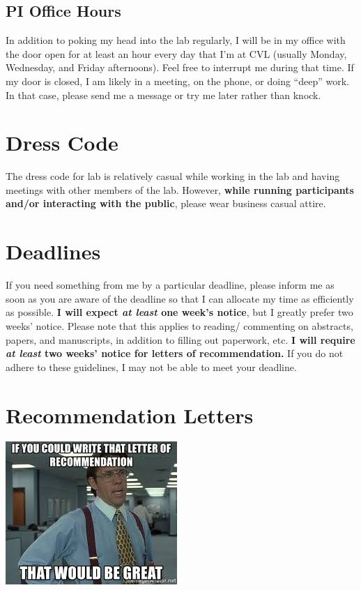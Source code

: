\documentclass[
]{book}
\begin{document}
\hypertarget{pi-office-hours}{%
\subsection{PI Office Hours}\label{pi-office-hours}}

In addition to poking my head into the lab regularly, I will be in my office with the door open for at least an hour every day that I'm at CVL (usually Monday, Wednesday, and Friday afternoons). Feel free to interrupt me during that time. If my door is closed, I am likely in a meeting, on the phone, or doing ``deep'' work. In that case, please send me a message or try me later rather than knock.

\hypertarget{dress-code}{%
\section{Dress Code}\label{dress-code}}

The dress code for lab is relatively casual while working in the lab and having meetings with other members of the lab. However,
\textbf{while running participants and/or interacting with the public}, please wear business casual attire.

\hypertarget{deadlines}{%
\section{Deadlines}\label{deadlines}}

If you need something from me by a particular deadline, please inform me as soon as you are aware of the deadline so that I can allocate my time as efficiently as possible. \textbf{I will expect \emph{at least} one week's notice}, but I greatly prefer two weeks' notice. Please note that this applies to reading/ commenting on abstracts, papers, and manuscripts, in addition to filling out paperwork, etc. \textbf{I will require \emph{at least} two weeks' notice for letters of recommendation.} If you do not adhere to these guidelines, I may not be able to meet your deadline.

\hypertarget{recommendation-letters}{%
\section{Recommendation Letters}\label{recommendation-letters}}

\includegraphics{images/recletter.jpg}
\end{document}
